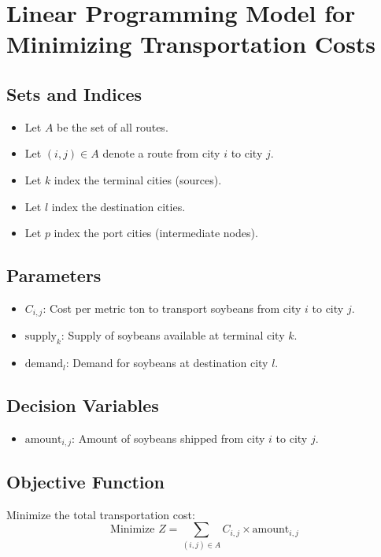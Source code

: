 \documentclass{article}
\begin{document}
\section*{Linear Programming Model for Minimizing Transportation Costs}

\subsection*{Sets and Indices}
\begin{itemize}
    \item Let \( A \) be the set of all routes.
    \item Let \((i,j) \in A\) denote a route from city \(i\) to city \(j\).
    \item Let \(k\) index the terminal cities (sources).
    \item Let \(l\) index the destination cities.
    \item Let \(p\) index the port cities (intermediate nodes).
\end{itemize}

\subsection*{Parameters}
\begin{itemize}
    \item \( C_{i,j} \): Cost per metric ton to transport soybeans from city \(i\) to city \(j\).
    \item \( \text{supply}_k \): Supply of soybeans available at terminal city \(k\).
    \item \( \text{demand}_l \): Demand for soybeans at destination city \(l\).
\end{itemize}

\subsection*{Decision Variables}
\begin{itemize}
    \item \( \text{amount}_{i,j} \): Amount of soybeans shipped from city \(i\) to city \(j\).
\end{itemize}

\subsection*{Objective Function}
Minimize the total transportation cost:
\[
\text{Minimize } Z = \sum_{(i,j) \in A} C_{i,j} \times \text{amount}_{i,j}
\]
\end{document}
